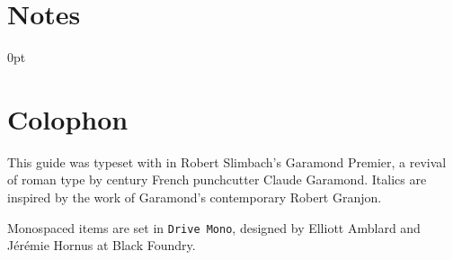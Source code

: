 \backmatter


\chapter{Notes}


\newlength{\enotewidth}
\settowidth{\enotewidth}{00.\enspace}

\renewcommand\enoteheading{}
\renewcommand\makeenmark{\theenmark.\enspace}
\renewcommand\enotesize{\normalsize}
\renewcommand\enoteformat{\leavevmode\llap{\makeenmark}}
\begin{adjustwidth}{\enotewidth}{0pt}
\raggedright
\theendnotes
\end{adjustwidth}

{\let\cleardoublepage\clearpage \chapter{Colophon}}

This guide was typeset with \LuaLaTeX{} in Robert Slimbach's Garamond Premier,
a revival of roman type by  century French punchcutter
Claude Garamond.
Italics are inspired by the work of Garamond's contemporary Robert Granjon.

Monospaced items are set in \texttt{Drive Mono},
designed by Elliott Amblard and Jérémie Hornus at Black Foundry.

